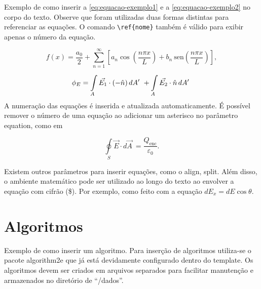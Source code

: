 Exemplo de como inserir a \autoref{eq:equacao-exemplo1} e a \cref{eq:equacao-exemplo2} no corpo do texto. Observe que foram utilizadas duas formas distintas para referenciar as equações. O comando \verb|\ref{nome}| também é válido para exibir apenas o número da equação.

\begin{equation}
    \label{eq:equacao-exemplo1}
    f(x) = \frac{a_0}{2} + \sum_{n=1}^{\infty} \left[a_n \cos{ \left( \frac{ n\pi x}{L} \right) }  +  b_n  \: \mathrm{sen}{ \left( \frac{ n\pi x}{L} \right) }     \right]
    ,
\end{equation}

\begin{align}
    \phi_E  = \int \limits_{A} \Vec{E_1}\cdot (-\Hat{n}) \, dA'\ + \int \limits_{A} \Vec{E_2}\cdot \Hat{n} \, dA'\
    \label{eq:equacao-exemplo2}
\end{align}
\noindent
A numeração das equações é inserida e atualizada automaticamente. É possível remover o número de uma equação ao adicionar um asterisco no parâmetro  {\ttfamily equation}, como em

\begin{equation*}
    \oint \limits_S \Vec{E}\cdot d \Vec{A}\ =
    \frac{Q_{\mathrm{enc}}}{\varepsilon_0}
    .
\end{equation*}

Existem outros parâmetros para inserir equações, como o {\ttfamily align},  {\ttfamily split}.
Além disso, o ambiente matemático pode ser utilizado ao longo do texto ao envolver a equação com cifrão (\$). Por exemplo, como feito com a equação $ dE_x = dE \cos\theta $.

\section{Algoritmos}
\label{sec:algoritmos}

Exemplo de como inserir um algoritmo. Para inserção de algoritmos utiliza-se o pacote {\ttfamily algorithm2e} que já está devidamente configurado dentro do template.
Os algoritmos devem ser criados em arquivos separados para facilitar manutenção e armazenados no diretório de ``/dados''. \\


